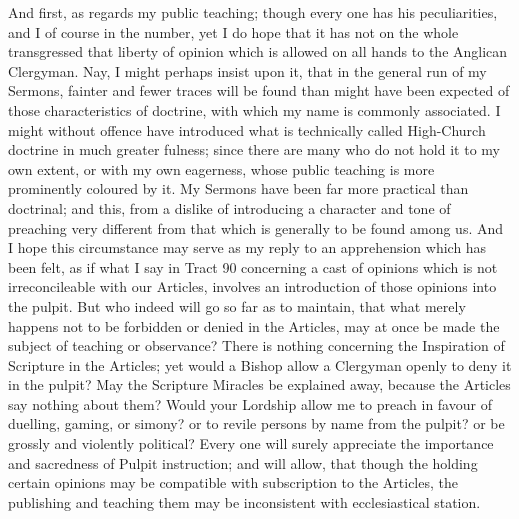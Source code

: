 And first, as regards my public teaching; though
every one has his peculiarities, and I of course in the number, yet I
do hope that it has not on the whole transgressed that liberty of
opinion which is allowed on all hands to the Anglican Clergyman. Nay,
I might perhaps insist upon it, that in the general run of my Sermons,
fainter and fewer traces will be found than might have been expected
of those characteristics of doctrine, with which my name is commonly
associated. I might without offence have introduced what is
technically called High-Church doctrine in much greater fulness; since
there are many who do not hold it to my own extent, or with my own
eagerness, whose public teaching is more prominently coloured by it.
My Sermons have been far more practical than doctrinal; and this, from
a dislike of introducing a character and tone of preaching very
different from that which is generally to be found among us. And I
hope this circumstance may serve as my reply to an apprehension which
has been felt, as if what I say in Tract 90 concerning a cast of
opinions which is not irreconcileable with our Articles, involves an
introduction of those opinions into the pulpit. But who indeed will go
so far as to maintain, that what merely happens not to be forbidden or
denied in the Articles, may at once be made the subject of teaching or
observance? There is nothing concerning the Inspiration of Scripture
in the Articles; yet would a Bishop allow a Clergyman openly to deny
it in the pulpit? May the Scripture Miracles be explained away,
because the Articles say nothing about them? Would your Lordship allow
me to preach in favour of duelling, gaming, or simony? or to revile
persons by name from the pulpit? or be grossly and violently
political? Every one will surely appreciate the importance and
sacredness of Pulpit instruction; and will allow, that though the
holding certain opinions may be compatible with subscription to the
Articles, the publishing and teaching them may be inconsistent with
ecclesiastical station.

